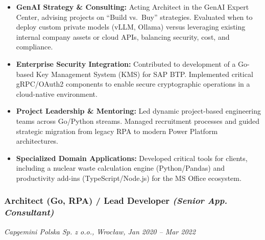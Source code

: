\documentclass[10pt,a4paper]{article}
\begin{document}
\begin{itemize}
\item
  \textbf{GenAI Strategy \& Consulting:} Acting Architect in the GenAI
  Expert Center, advising projects on ``Build vs.~Buy'' strategies.
  Evaluated when to deploy custom private models (vLLM, Ollama) versus
  leveraging existing internal company assets or cloud APIs, balancing
  security, cost, and compliance.
\item
  \textbf{Enterprise Security Integration:} Contributed to development
  of a Go-based Key Management System (KMS) for SAP BTP. Implemented
  critical gRPC/OAuth2 components to enable secure cryptographic
  operations in a cloud-native environment.
\item
  \textbf{Project Leadership \& Mentoring:} Led dynamic project-based
  engineering teams across Go/Python streams. Managed recruitment
  processes and guided strategic migration from legacy RPA to modern
  Power Platform architectures.
\item
  \textbf{Specialized Domain Applications:} Developed critical tools for
  clients, including a nuclear waste calculation engine (Python/Pandas)
  and productivity add-ins (TypeScript/Node.js) for the MS Office
  ecosystem.
\end{itemize}

\subsubsection{\texorpdfstring{Architect (Go, RPA) / Lead Developer
\emph{(Senior App.
Consultant)}}{Architect (Go, RPA) / Lead Developer (Senior App. Consultant)}}\label{architect-go-rpa-lead-developer-senior-app.-consultant}

\emph{Capgemini Polska Sp. z o.o., Wrocław, Jan 2020 -- Mar 2022}
\end{document}
